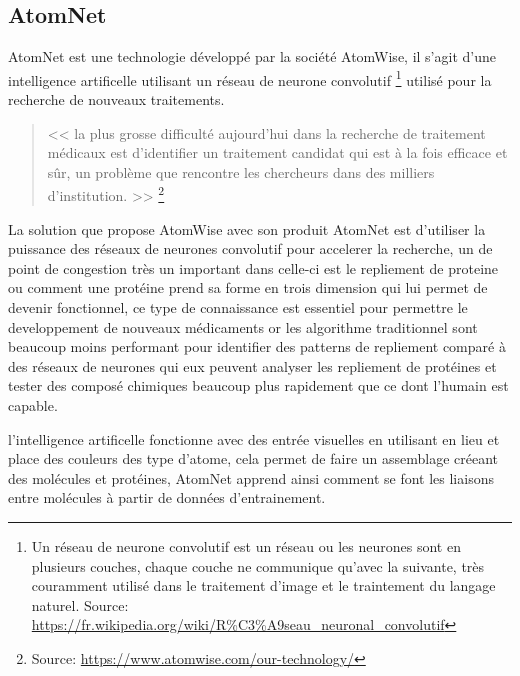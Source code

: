         \subsection*{AtomNet}
            AtomNet est une technologie développé par la société AtomWise,
            il s'agit d'une intelligence artificelle utilisant un réseau de neurone convolutif
            \footnote{Un réseau de neurone convolutif est un réseau ou les neurones sont en plusieurs 
            couches, chaque couche ne communique qu'avec la suivante, très couramment utilisé dans le
            traitement d'image et le traintement du langage naturel.
            Source: \url{https://fr.wikipedia.org/wiki/R\%C3\%A9seau_neuronal_convolutif}}
            utilisé pour la recherche de nouveaux traitements.
           \begin{quote}
            << la plus grosse difficulté aujourd'hui dans la recherche de traitement médicaux 
            est d'identifier un traitement candidat qui est à la fois efficace et sûr, un problème 
            que rencontre les chercheurs dans des milliers d'institution. >> 
            \footnote{Source: \url{https://www.atomwise.com/our-technology/}}
            \end{quote}
            La solution que propose AtomWise avec son produit AtomNet est d'utiliser la puissance 
            des réseaux de neurones convolutif pour accelerer la recherche, un de point de congestion
            très un important dans celle-ci est le repliement de proteine ou comment une protéine 
            prend sa forme en trois dimension qui lui permet de devenir fonctionnel, ce type de connaissance 
            est essentiel pour permettre le developpement de nouveaux médicaments or les 
            algorithme traditionnel sont beaucoup moins performant pour identifier des patterns
            de repliement comparé à des réseaux de neurones qui eux peuvent analyser les repliement 
            de protéines et tester des composé chimiques beaucoup plus rapidement que ce dont 
            l'humain est capable. \newline 

            l'intelligence artificelle fonctionne avec des entrée visuelles en utilisant en lieu et place 
            des couleurs des type d'atome, cela permet de faire un assemblage créeant des molécules et 
            protéines, AtomNet apprend ainsi comment se font les liaisons entre molécules à partir de 
            données d'entrainement. \newline
            \newpage

